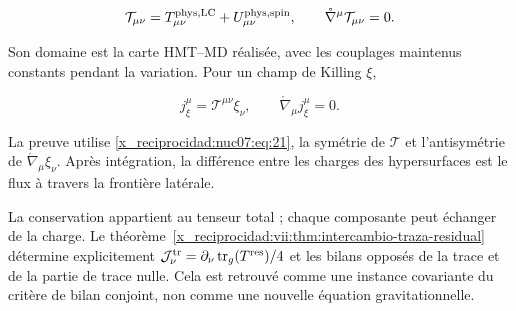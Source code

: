 \begin{equation}
\mathcal T_{\mu\nu}
=T^{\rm phys,LC}_{\mu\nu}+U^{\rm phys,spin}_{\mu\nu},
\qquad
\mathring\nabla^\mu\mathcal T_{\mu\nu}=0.
\label{x_reciprocidad:nuc07:eq:21}
\end{equation}

Son domaine est la carte HMT–MD réalisée, avec les couplages maintenus constants pendant la variation. Pour un champ de Killing \(\xi\),

\begin{equation}
j^\mu_\xi=\mathcal T^{\mu\nu}\xi_\nu,\qquad
\mathring\nabla_\mu j^\mu_\xi=0.
\label{x_reciprocidad:nuc07:eq:22}
\end{equation}

La preuve utilise \eqref{x_reciprocidad:nuc07:eq:21}, la symétrie de \(\mathcal T\) et l’antisymétrie de \(\mathring\nabla_\mu\xi_\nu\). Après intégration, la différence entre les charges des hypersurfaces est le flux à travers la frontière latérale.

La conservation appartient au tenseur total ; chaque composante peut échanger de la charge. Le théorème~\ref{x_reciprocidad:vii:thm:intercambio-traza-residual} détermine explicitement \(\mathcal J^{\rm tr}_\nu=\partial_\nu\operatorname{tr}_g(T^{\rm res})/4\) et les bilans opposés de la trace et de la partie de trace nulle. Cela est retrouvé comme une instance covariante du critère de bilan conjoint, non comme une nouvelle équation gravitationnelle.
